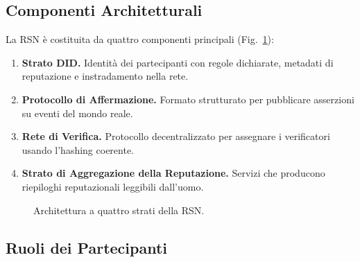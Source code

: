 \documentclass[11pt,a4paper,twocolumn]{article}
\begin{document}
\subsection{Componenti Architetturali}

La RSN è costituita da quattro componenti principali (Fig.~\ref{fig:architecture}):
\begin{enumerate}[nosep]
\item \textbf{Strato DID.} Identità dei partecipanti con regole dichiarate, metadati di reputazione e instradamento nella rete.
\item \textbf{Protocollo di Affermazione.} Formato strutturato per pubblicare asserzioni su eventi del mondo reale.
\item \textbf{Rete di Verifica.} Protocollo decentralizzato per assegnare i verificatori usando l'hashing coerente.
\item \textbf{Strato di Aggregazione della Reputazione.} Servizi che producono riepiloghi reputazionali leggibili dall'uomo.
\end{enumerate}

\begin{figure}[ht]
\centering
{}
\caption{Architettura a quattro strati della RSN.}
\label{fig:architecture}
\end{figure}

\subsection{Ruoli dei Partecipanti}
\end{document}

